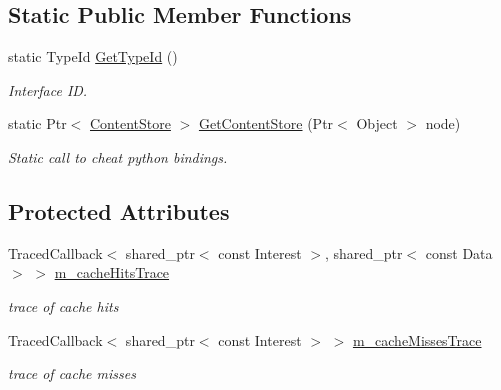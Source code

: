 \subsection*{Static Public Member Functions}
\begin{DoxyCompactItemize}
\item 
static Type\+Id \hyperlink{classns3_1_1ndn_1_1ContentStore_a436a18726527fd276fb72315b881e6cc}{Get\+Type\+Id} ()
\begin{DoxyCompactList}\small\item\em Interface ID. \end{DoxyCompactList}\item 
static Ptr$<$ \hyperlink{classns3_1_1ndn_1_1ContentStore}{Content\+Store} $>$ \hyperlink{classns3_1_1ndn_1_1ContentStore_ae299e9596f489bfee20cd11429c2423d}{Get\+Content\+Store} (Ptr$<$ Object $>$ node)\hypertarget{classns3_1_1ndn_1_1ContentStore_ae299e9596f489bfee20cd11429c2423d}{}\label{classns3_1_1ndn_1_1ContentStore_ae299e9596f489bfee20cd11429c2423d}

\begin{DoxyCompactList}\small\item\em Static call to cheat python bindings. \end{DoxyCompactList}\end{DoxyCompactItemize}
\subsection*{Protected Attributes}
\begin{DoxyCompactItemize}
\item 
Traced\+Callback$<$ shared\+\_\+ptr$<$ const Interest $>$, shared\+\_\+ptr$<$ const Data $>$ $>$ \hyperlink{classns3_1_1ndn_1_1ContentStore_a5f11bebf2a8ed2b57902dd44e0179b26}{m\+\_\+cache\+Hits\+Trace}\hypertarget{classns3_1_1ndn_1_1ContentStore_a5f11bebf2a8ed2b57902dd44e0179b26}{}\label{classns3_1_1ndn_1_1ContentStore_a5f11bebf2a8ed2b57902dd44e0179b26}

\begin{DoxyCompactList}\small\item\em trace of cache hits \end{DoxyCompactList}\item 
Traced\+Callback$<$ shared\+\_\+ptr$<$ const Interest $>$ $>$ \hyperlink{classns3_1_1ndn_1_1ContentStore_a227970bf5b69408d80706cdf5b606d7f}{m\+\_\+cache\+Misses\+Trace}\hypertarget{classns3_1_1ndn_1_1ContentStore_a227970bf5b69408d80706cdf5b606d7f}{}\label{classns3_1_1ndn_1_1ContentStore_a227970bf5b69408d80706cdf5b606d7f}

\begin{DoxyCompactList}\small\item\em trace of cache misses \end{DoxyCompactList}\end{DoxyCompactItemize}


